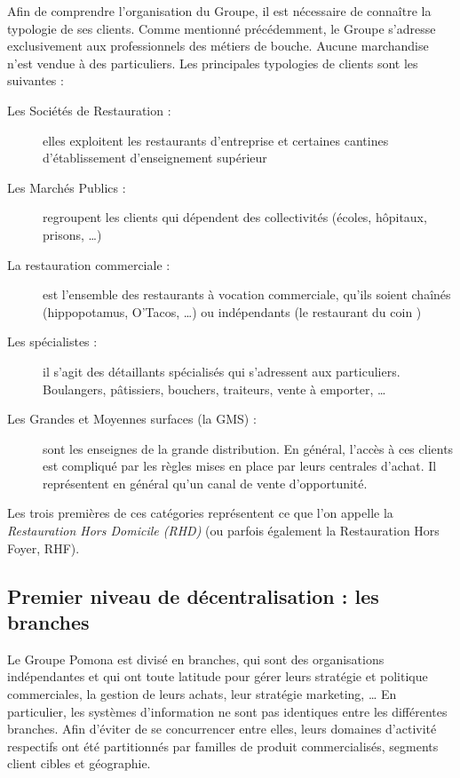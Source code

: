             Afin de comprendre l'organisation du Groupe, il est nécessaire de connaître la typologie de ses clients.
            Comme mentionné précédemment, le Groupe s'adresse exclusivement aux professionnels des métiers de bouche.
            Aucune marchandise n'est vendue à des particuliers.
            Les principales typologies de clients sont les suivantes : 
            \begin{description}
                \item[Les Sociétés de Restauration :] elles exploitent les restaurants d'entreprise et certaines cantines d'établissement d'enseignement supérieur
                \item[Les Marchés Publics :] regroupent les clients qui dépendent des collectivités (écoles, hôpitaux, prisons, \dots)
                \item[La restauration commerciale :] est l'ensemble des restaurants à vocation commerciale, qu'ils soient chaînés (hippopotamus, O'Tacos, \dots) ou indépendants (\og le restaurant du coin \fg)
                \item[Les spécialistes :] il s'agit des détaillants spécialisés qui s'adressent aux particuliers. Boulangers, pâtissiers, bouchers, traiteurs, vente à emporter, \dots
                \item[Les Grandes et Moyennes surfaces (la GMS) :] sont les enseignes de la grande distribution. En général, l'accès à ces clients est compliqué par les règles mises en place par leurs centrales d'achat. Il représentent en général qu'un canal de vente d'opportunité.
            \end{description}

            Les trois premières de ces catégories représentent ce que l'on appelle la \emph{Restauration Hors Domicile (RHD)} (ou parfois également la Restauration Hors Foyer, RHF).

            \subsection{Premier niveau de décentralisation : les branches}
            \label{les_branches}
            Le Groupe Pomona est divisé en branches, qui sont des organisations indépendantes et qui ont toute latitude pour gérer leurs stratégie et politique commerciales, la gestion de leurs achats, leur stratégie marketing, \dots
            En particulier, les systèmes d'information ne sont pas identiques entre les différentes branches.
            Afin d'éviter de se concurrencer entre elles, leurs domaines d'activité respectifs ont été partitionnés par familles de produit commercialisés, segments client cibles et géographie. 

